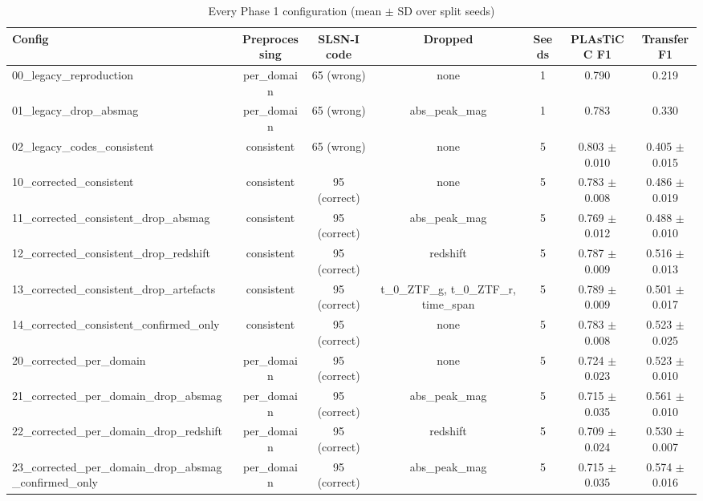 \begin{table}
\centering
\caption{Every Phase 1 configuration (mean $\pm$ SD over split seeds)}
\begin{tabular}{lcccccc}
\hline
Config & Preprocessing & SLSN-I code & Dropped & Seeds & PLAsTiCC F1 & Transfer F1 \\
\hline
00\_legacy\_reproduction & per\_domain & 65 (wrong) & none & 1 & 0.790 & 0.219 \\
01\_legacy\_drop\_absmag & per\_domain & 65 (wrong) & abs\_peak\_mag & 1 & 0.783 & 0.330 \\
02\_legacy\_codes\_consistent & consistent & 65 (wrong) & none & 5 & 0.803 $\pm$ 0.010 & 0.405 $\pm$ 0.015 \\
10\_corrected\_consistent & consistent & 95 (correct) & none & 5 & 0.783 $\pm$ 0.008 & 0.486 $\pm$ 0.019 \\
11\_corrected\_consistent\_drop\_absmag & consistent & 95 (correct) & abs\_peak\_mag & 5 & 0.769 $\pm$ 0.012 & 0.488 $\pm$ 0.010 \\
12\_corrected\_consistent\_drop\_redshift & consistent & 95 (correct) & redshift & 5 & 0.787 $\pm$ 0.009 & 0.516 $\pm$ 0.013 \\
13\_corrected\_consistent\_drop\_artefacts & consistent & 95 (correct) & t\_0\_ZTF\_g, t\_0\_ZTF\_r, time\_span & 5 & 0.789 $\pm$ 0.009 & 0.501 $\pm$ 0.017 \\
14\_corrected\_consistent\_confirmed\_only & consistent & 95 (correct) & none & 5 & 0.783 $\pm$ 0.008 & 0.523 $\pm$ 0.025 \\
20\_corrected\_per\_domain & per\_domain & 95 (correct) & none & 5 & 0.724 $\pm$ 0.023 & 0.523 $\pm$ 0.010 \\
21\_corrected\_per\_domain\_drop\_absmag & per\_domain & 95 (correct) & abs\_peak\_mag & 5 & 0.715 $\pm$ 0.035 & 0.561 $\pm$ 0.010 \\
22\_corrected\_per\_domain\_drop\_redshift & per\_domain & 95 (correct) & redshift & 5 & 0.709 $\pm$ 0.024 & 0.530 $\pm$ 0.007 \\
23\_corrected\_per\_domain\_drop\_absmag\_confirmed\_only & per\_domain & 95 (correct) & abs\_peak\_mag & 5 & 0.715 $\pm$ 0.035 & 0.574 $\pm$ 0.016 \\
\hline
\end{tabular}
\end{table}
